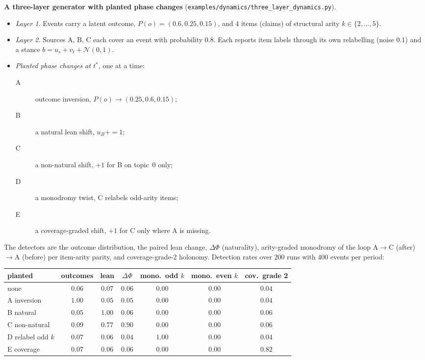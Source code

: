 \documentclass[11pt]{article}
\theoremstyle{definition}
\theoremstyle{remark}
\begin{document}
\textbf{A three-layer generator with planted phase changes} (\texttt{examples/dynamics/three\_layer\_dynamics.py}).
\begin{itemize}
  \item \emph{Layer 1.} Events carry a latent outcome, $P(o)=(0.6,0.25,0.15)$, and 4 items (claims) of structural arity $k\in\{2,\dots,5\}$.
  \item \emph{Layer 2.} Sources A, B, C each cover an event with probability $0.8$. Each reports item labels through its own relabelling (noise $0.1$) and a stance $b=u_s+v_t+\mathcal N(0,1)$.
  \item \emph{Planted phase changes at $t^*$}, one at a time:
  \begin{description}
    \item[A] outcome inversion, $P(o)\to(0.25,0.6,0.15)$;
    \item[B] a natural lean shift, $u_B{+}{=}1$;
    \item[C] a non-natural shift, $+1$ for B on topic~0 only;
    \item[D] a monodromy twist, C relabels odd-arity items;
    \item[E] a coverage-graded shift, $+1$ for C only where A is missing.
  \end{description}
\end{itemize}
The detectors are the outcome distribution, the paired lean change, $\Delta\Phi$ (naturality), arity-graded monodromy of the loop A$\to$C (after)$\to$A (before) per item-arity parity, and coverage-grade-2 holonomy. Detection rates over 200 runs with 400 events per period:
\begin{center}\small
\begin{tabular}{lcccccc}
\toprule
planted & outcomes & lean & $\Delta\Phi$ & mono.\ odd $k$ & mono.\ even $k$ & cov.\ grade 2\\
\midrule
none & $0.06$ & $0.07$ & $0.06$ & $0.00$ & $0.00$ & $0.04$\\
A inversion & $\mathbf{1.00}$ & $0.05$ & $0.05$ & $0.00$ & $0.00$ & $0.04$\\
B natural & $0.05$ & $\mathbf{1.00}$ & $0.06$ & $0.00$ & $0.00$ & $0.06$\\
C non-natural & $0.09$ & $0.77$ & $\mathbf{0.90}$ & $0.00$ & $0.00$ & $0.06$\\
D relabel odd $k$ & $0.07$ & $0.06$ & $0.04$ & $\mathbf{1.00}$ & $0.00$ & $0.04$\\
E coverage & $0.07$ & $0.06$ & $0.06$ & $0.00$ & $0.00$ & $\mathbf{0.82}$\\
\bottomrule
\end{tabular}
\end{center}
\end{document}
